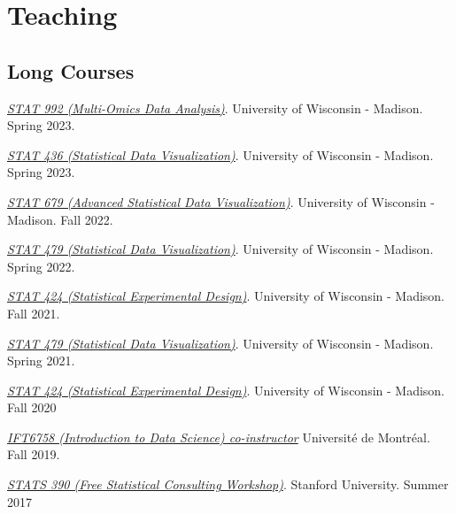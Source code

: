 \documentclass[letterpaper]{article}
\renewenvironment{itemize}{
  \begin{list}{}{
    \setlength{\leftmargin}{1.5em}
  }
}{
  \end{list}
}
\begin{document}
\section*{Teaching}

\subsection*{Long Courses}

\begin{itemize}
\item \textit{\href{https://krisrs1128.github.io/stat992_s23/}{STAT 992 (Multi-Omics Data Analysis)}}. 
University of Wisconsin - Madison. Spring 2023.
\item \textit{\href{https://krisrs1128.github.io/stat436_s23/}{STAT 436 (Statistical Data Visualization)}}.
University of Wisconsin - Madison. Spring 2023.
\item \textit{\href{https://krisrs1128.github.io/stat679_notes/}{STAT 679 (Advanced Statistical Data Visualization)}}.
University of Wisconsin - Madison. Fall 2022.
\item \textit{\href{https://github.com/krisrs1128/stat479_s22}{STAT 479 (Statistical Data Visualization)}}.
University of Wisconsin - Madison. Spring 2022.
\item \textit{\href{https://krisrs1128.github.io/stat424_f21}{STAT 424 (Statistical Experimental Design)}}.
University of Wisconsin - Madison. Fall 2021.
\item \textit{\href{https://krisrs1128/github.io/stat479/}{STAT 479 (Statistical Data Visualization)}}.
University of Wisconsin - Madison. Spring 2021.
\item \textit{\href{https://mediaspace.wisc.edu/channel/STAT424Fall2020/180027062}{STAT
424 (Statistical Experimental Design)}}. University of Wisconsin - Madison. Fall
2020
\item \textit{\href{https://ift6758.github.io/}{IFT6758 (Introduction to Data Science) co-instructor}}
Universit\'e de Montr\'eal. Fall 2019.
\item \href{https://www.overleaf.com/10240923zrkwyvndkwnn#/37916755/}{\textit{STATS 390 (Free Statistical Consulting Workshop)}}.
  Stanford University. Summer 2017
\end{itemize}
\end{document}
